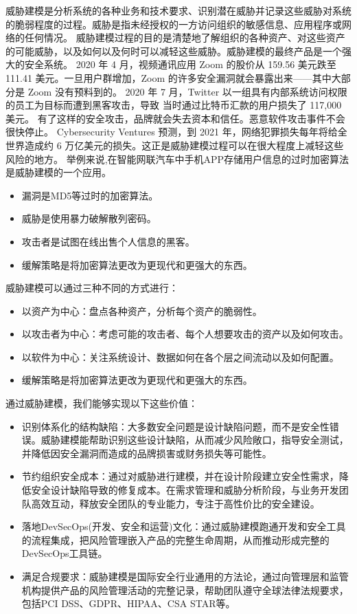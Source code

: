 威胁建模是分析系统的各种业务和技术要求、识别潜在威胁并记录这些威胁对系统的脆弱程度的过程。威胁是指未经授权的一方访问组织的敏感信息、应用程序或网络的任何情况。 
威胁建模过程的目的是清楚地了解组织的各种资产、对这些资产的可能威胁，以及如何以及何时可以减轻这些威胁。威胁建模的最终产品是一个强大的安全系统。 
2020 年 4 月，视频通讯应用 Zoom 的股价从 159.56 美元跌至 111.41 美元。一旦用户群增加，Zoom 的许多安全漏洞就会暴露出来——其中大部分是 Zoom 没有预料到的。
2020 年 7 月，Twitter 以一组具有内部系统访问权限的员工为目标而遭到黑客攻击，导致 当时通过比特币汇款的用户损失了 117,000 美元。 
有了这样的安全攻击，品牌就会失去资本和信任。恶意软件攻击事件不会很快停止。
Cyber​​security Ventures 预测\cite{apache1}，到 2021 年，网络犯罪损失每年将给全世界造成约 6 万亿美元的损失。这正是威胁建模过程可以在很大程度上减轻这些风险的地方。 
\newline
举例来说,在智能网联汽车中手机APP存储用户信息的过时加密算法是威胁建模的一个应用。
\begin{itemize}
    \item 漏洞是MD5等过时的加密算法。
    \item 威胁是使用暴力破解散列密码。
    \item 攻击者是试图在线出售个人信息的黑客。
    \item 缓解策略是将加密算法更改为更现代和更强大的东西。
  \end{itemize}
威胁建模可以通过三种不同的方式进行：
\begin{itemize}
  \item 以资产为中心：盘点各种资产，分析每个资产的脆弱性。
  \item 以攻击者为中心：考虑可能的攻击者、每个人想要攻击的资产以及如何攻击。
  \item 以软件为中心：关注系统设计、数据如何在各个层之间流动以及如何配置。
  \item 缓解策略是将加密算法更改为更现代和更强大的东西。
\end{itemize} 
通过威胁建模，我们能够实现以下这些价值：
\begin{itemize}
    \item 识别体系化的结构缺陷：大多数安全问题是设计缺陷问题，而不是安全性错误。威胁建模能帮助识别这些设计缺陷，从而减少风险敞口，指导安全测试，并降低因安全漏洞而造成的品牌损害或财务损失等可能性。
    \item 节约组织安全成本：通过对威胁进行建模，并在设计阶段建立安全性需求，降低安全设计缺陷导致的修复成本。在需求管理和威胁分析阶段，与业务开发团队高效互动，释放安全团队的专业能力，专注于高性价比的安全建设。
    \item 落地DevSecOps(开发、安全和运营)文化：通过威胁建模跑通开发和安全工具的流程集成，把风险管理嵌入产品的完整生命周期，从而推动形成完整的DevSecOps工具链。
    \item 满足合规要求：威胁建模是国际安全行业通用的方法论，通过向管理层和监管机构提供产品的风险管理活动的完整记录，帮助团队遵守全球法律法规要求，包括PCI DSS、GDPR、HIPAA、CSA STAR等。
  \end{itemize}
